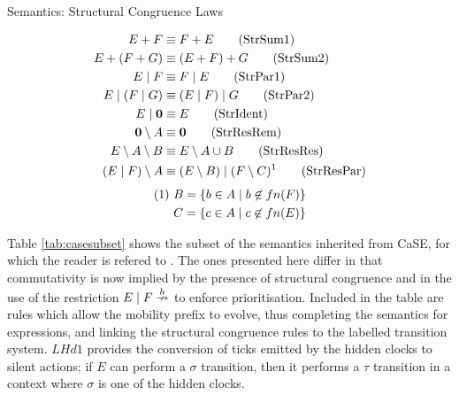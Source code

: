 \documentclass[orivec,envcountsame]{llncs}
\begin{document}
\begin{table}
  \caption{Semantics: Structural Congruence Laws}
 \label{tab:structcong}
 \vspace{-3mm}
  \shrule
  \begin{align}
   E + F & \equiv F + E \tag{StrSum1} \label{structsum1}
  \\
   E + (F + G) & \equiv (E + F) + G \tag{StrSum2} \label{structsum2}
   \\
    E \mid F & \equiv F \mid E \tag{StrPar1} \label{structpar1}
  \\
   E \mid (F \mid G) & \equiv (E \mid F) \mid G \tag{StrPar2} \label{structpar2}
 \\
    E \mid \textbf{0} & \equiv E \tag{StrIdent} \label{structident}
   \\
    \textbf{0} \setminus {A} & \equiv \textbf{0} \tag{StrResRem}
   \label{structresremove}
   \\
    E \setminus {A} \setminus {B} & \equiv E \setminus {A \cup B}
   \tag{StrResRes} \label{structresres}
   \\
    (E \mid F) \setminus {A} & \equiv (E \setminus {B}) \mid (F
   \setminus {C})^1 \tag{StrResPar} \label{structrespar}
\end{align}
\begin{align} 
   (1)\ & B = \{b \in A \mid b \not \in fn(F)\} \notag \\ 
   & C = \{c \in A \mid c \not \in fn(E)\} \notag
 \end{align} 
  \shrule
\end{table}

Table \ref{tab:casesubset} shows the subset of the semantics inherited
from CaSE, for which the reader is refered to \cite{case}.  The ones
presented here differ in that commutativity is now implied by the
presence of structural congruence and in the use of the restriction $E
\;|\; F \stackrel{h}{\nrightarrow}$ to enforce prioritisation.  Included in the table
are rules which allow the mobility prefix to evolve, thus completing the
semantics for expressions, and linking the structural congruence rules
to the labelled transition system.  $LHd1$ provides the conversion of
ticks emitted by the hidden clocks to silent actions; if $E$ can perform
a $\sigma$ transition, then it performs a $\tau$ transition in a context
where $\sigma$ is one of the hidden clocks.
\end{document}
